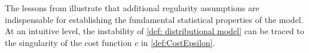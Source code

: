 \documentclass{amsart}
\theoremstyle{plain}
\numberwithin{equation}{section}\newtheorem{theorem}{Theorem}[section]
\theoremstyle{remark}
\begin{document}






The lessons from  illustrate that additional regularity assumptions are indispensable for establishing the fundamental statistical properties of the model. At an intuitive level, the instability of \eqref{def: distributional model} can be traced to the singularity of the cost function $c$ in \eqref{def:CostEpsilon}. 
\end{document}

